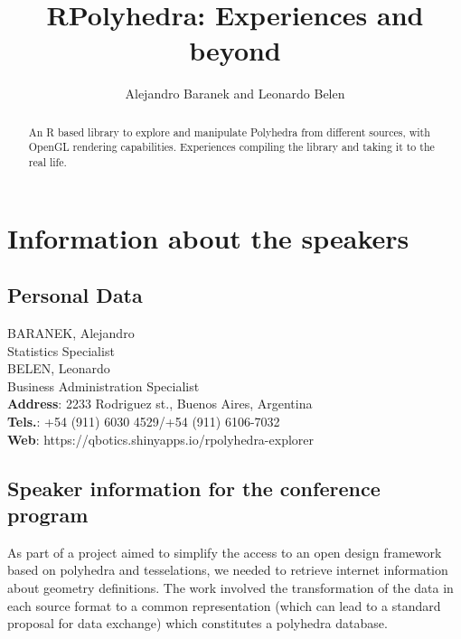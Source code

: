 \documentclass[a4paper,10pt]{article}
\title{RPolyhedra: Experiences and beyond}
\author{Alejandro Baranek and Leonardo Belen}
\begin{document}
\maketitle
\thispagestyle{Title} 


\begin{abstract}
An R based library to explore and manipulate Polyhedra from different sources, with OpenGL rendering capabilities. Experiences compiling the library and taking it to the real life.  
\end{abstract}


\section{Information about the speakers}

\subsection{Personal Data}
BARANEK, Alejandro \\
Statistics Specialist \\
BELEN, Leonardo \\
Business Administration Specialist \\

\textbf{Address}: 2233 Rodriguez st., Buenos Aires, Argentina \\
\textbf{Tels.}: +54 (911) 6030 4529/+54 (911) 6106-7032\\
\textbf{Web}: https://qbotics.shinyapps.io/rpolyhedra-explorer \\



\subsection{Speaker information for the conference program}




As part of a project aimed to simplify the access to an open design framework based on polyhedra and tesselations, we needed to retrieve internet information about geometry definitions. The work involved the transformation of the data in each source format to a common representation (which can lead to a standard proposal for data exchange) which constitutes a polyhedra database.  
\end{document}
